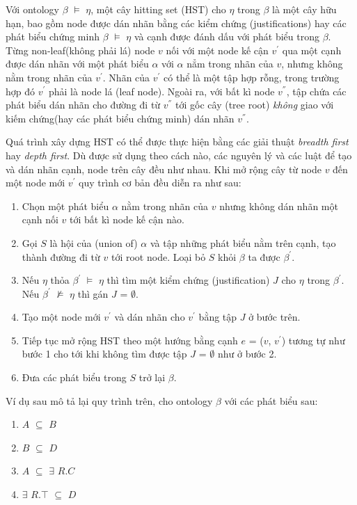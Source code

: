 \hspace*{.05\textwidth} Với ontology $\beta$ $\models$ $\eta$, một cây hitting set (HST) cho $\eta$ trong $\beta$ là một cây hữu hạn, bao gồm node được dán nhãn bằng các kiểm chứng (justifications) hay các phát biểu chứng minh $\beta$ $\models$ $\eta$ và cạnh được đánh dấu với phát biểu trong $\beta$. Từng non-leaf(không phải lá) node $v$ nối với một node kế cận $v^{'}$ qua một cạnh được dán nhãn với một phát biểu $\alpha$ với $\alpha$ nẳm trong nhãn của $v$, nhưng không nằm trong nhãn của $v^{'}$. Nhãn của $v^{'}$ có thể là một tập hợp rỗng, trong trường hợp đó $v^{'}$ phải là node lá (leaf node). Ngoài ra, với bất kì node $v^{''}$, tập chứa các phát biểu dán nhãn cho đường đi từ $v^{''}$ tới gốc cây (tree root) \textit{không} giao với kiếm chứng(hay các phát biểu chứng minh) dán nhãn $v^{''}$.

\hspace*{.05\textwidth} Quá trình xây dựng HST có thể được thực hiện bằng các giải thuật \textit{breadth first} hay \textit{depth first}. Dù được sử dụng theo cách nào, các nguyên lý và các luật để tạo và dán nhãn cạnh, node trên cây đều như nhau. Khi mở rộng cây từ node $v$ đến một node mới $v^{'}$ quy trình cơ bản đều diễn ra như sau:
		\begin{enumerate}
			\item Chọn một phát biểu $\alpha$ nằm trong nhãn của $v$ nhưng không dán nhãn một cạnh nối $v$ tới bất kì node kế cận nào.
			\item Gọi $S$ là hội của (union of) {$\alpha$} và tập những phát biểu nằm trên cạnh, tạo thành đường đi từ $v$ tới root node. Loại bỏ $S$ khỏi $\beta$ ta được $\beta^{'}$.
			\item Nếu $\eta$ thỏa $\beta^{'}$ $\models$ $\eta$ thì tìm một kiểm chứng (justification) $J$ cho $\eta$ trong $\beta^{'}$. Nếu $\beta^{'}$ $\not\models$ $\eta$ thì gán $J$ = $\emptyset$.
			\item Tạo một node mới $v^{'}$ và dán nhãn cho $v^{'}$ bằng tập $J$ ở bước trên.
			\item Tiếp tục mở rộng HST theo một hướng bằng cạnh $e$ = ($v$, $v^{'}$) tương tự như bước 1 cho tới khi không tìm được tập $J$ = $\emptyset$ như ở bước 2.
			\item Đưa các phát biểu trong $S$ trở lại $\beta$.
		\end{enumerate}
		Ví dụ sau mô tả lại quy trình trên, cho ontology $\beta$  với các phát biểu sau:
		\begin{enumerate}
			\item $A$ $\subseteq$ $B$
			\item $B$ $\subseteq$ $D$ 
			\item $A$ $\subseteq$ $\exists$ $R.C$ 
			\item $\exists$ $R.\top$ $\subseteq$ $D$
		\end{enumerate} 

